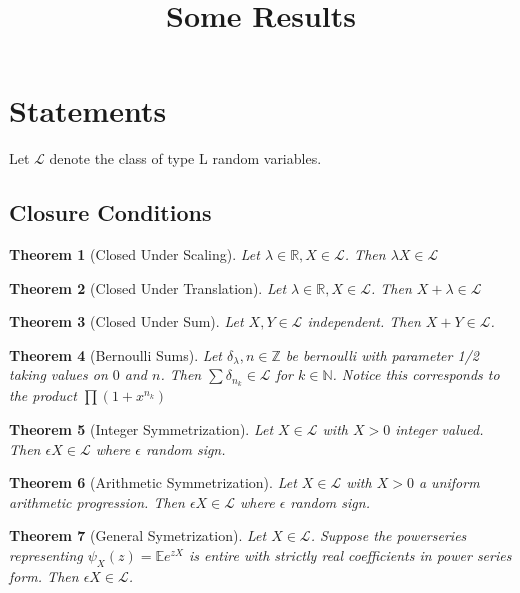 \documentclass[10pt]{article}
\title{\vspace{-3em}Some Results}
\newcommand{\E}{\mathbb{E}}
\newcommand{\1}{\textbf{1}}
\newcommand{\R}{\mathbb{R}}
\newcommand{\Z}{\mathbb{Z}}
\newcommand{\N}{\mathbb{N}}
\newcommand{\lL}{\mathcal{L}}
\newtheorem{theorem}{Theorem}
\theoremstyle{remark}
\theoremstyle{definition}
\begin{document}
\section{Statements}

Let $\lL$ denote the class of type L random variables.


\subsection{Closure Conditions}

\begin{theorem}[Closed Under Scaling] \label{them:MULT}
	Let $\lambda \in \R, X \in \lL$. Then $\lambda X \in \lL$
\end{theorem}

\begin{theorem}[Closed Under Translation] \label{them:SHIFT}
	Let $\lambda \in \R, X \in \lL$. Then $X+\lambda \in \lL$
\end{theorem}

\begin{theorem}[Closed Under Sum] \label{them:SUM}
	Let $X,Y \in \lL$ independent. Then $X+Y \in \lL$.
\end{theorem}


\begin{theorem}[Bernoulli Sums] \label{them:BER}
	Let $\delta_{\lambda}, n \in \Z$ be bernoulli with parameter 1/2 taking values on $0$ and $n$. Then $\sum \delta_{n_k} \in \lL$ for $k \in \N$. Notice this corresponds to the product $\prod (1+x^{n_k})$ 
\end{theorem}

\begin{theorem}[Integer Symmetrization] \label{them:ISYM}
	Let $X \in \lL$ with $X > 0$ integer valued. Then $\epsilon X \in \lL$ where $\epsilon$ random sign.
\end{theorem}

\begin{theorem}[Arithmetic Symmetrization] \label{them:ASYM}
	Let $X \in \lL$ with $X > 0$ a uniform arithmetic progression. Then $\epsilon X \in \lL$ where $\epsilon$ random sign.
\end{theorem}

\begin{theorem}[General Symetrization] \label{them:GSYM}
	Let $X \in \lL$. Suppose the powerseries representing $\psi_X(z) = \E e^{z X}$ is entire with strictly real coefficients in power series form. Then $\epsilon X \in \lL$.
\end{theorem}
\end{document}
